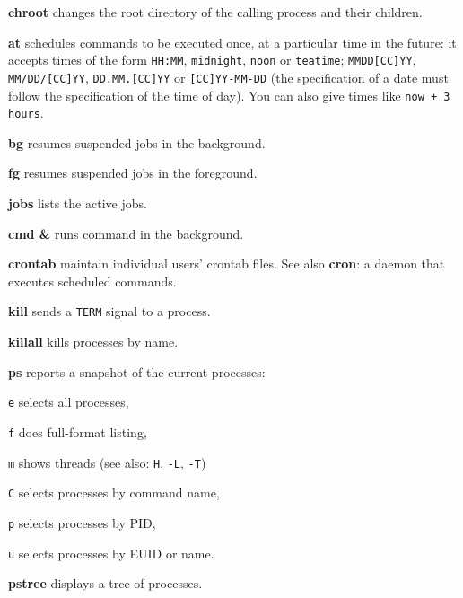 \begin{compactenum}
	\item [\cmdcore] \textbf{chroot} changes the root directory of the calling process and their children.
\end{compactenum}

\begin{compactenum}
	\item [\cmdvar] \textbf{at} schedules commands to be executed once, 
	at a particular time in the future: it accepts times of the form 
	\texttt{HH:MM}, \texttt{midnight}, \texttt{noon} or \texttt{teatime}; 
	\texttt{MMDD[CC]YY}, \texttt{MM/DD/[CC]YY}, \texttt{DD.MM.[CC]YY} or 
	\texttt{[CC]YY-MM-DD} (the specification of a date 
	must follow the specification of the time of day).
	You can also give times like \texttt{now + 3 hours}.
\end{compactenum}

\begin{compactenum}
	\item [\cmdvar] \textbf{bg} resumes suspended jobs in the background.
	\item [\cmdvar] \textbf{fg} resumes suspended jobs in the foreground.
	\item [\cmdvar] \textbf{jobs} lists the active jobs.
	\item [\cmdvar] \textbf{cmd \&} runs command in the background.
\end{compactenum}

\begin{compactenum}
	\item [\cmdvar] \textbf{crontab} maintain individual users' crontab files.
	See also \textbf{cron}: a daemon that executes scheduled commands.
\end{compactenum}

\begin{compactenum}
	\item [\cmdutil] \textbf{kill} sends a \texttt{TERM} signal to a process.
	\item [\cmdvar] \textbf{killall} kills processes by name.
\end{compactenum}

\begin{compactenum}
	\item [\cmdvar] \textbf{ps} reports a snapshot of the current processes:
	\item [\texttt{e}] selects all processes,
	\item [\texttt{f}] does full-format listing,
	\item [\texttt{m}] shows threads (see also: \texttt{H}, \texttt{-L}, \texttt{-T})
	\item [\texttt{C}] selects processes by command name,
	\item [\texttt{p}] selects processes by PID,
	\item [\texttt{u}] selects processes by EUID or name. 
	\item [\cmdvar] \textbf{pstree} displays a tree of processes.
\end{compactenum}

